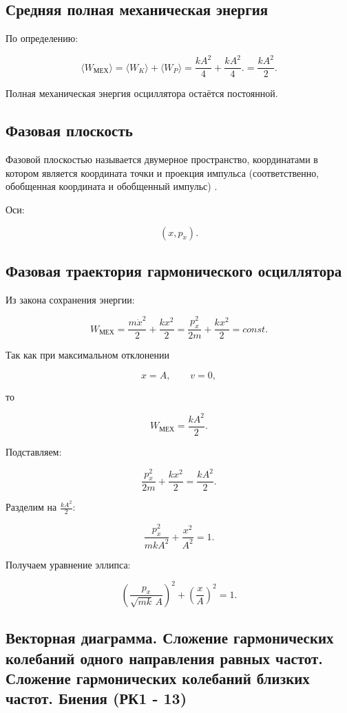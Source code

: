 \documentclass[a4paper,12pt]{article}
\begin{document}
\subsection*{Средняя полная механическая энергия}

По определению:

\[
\langle W_{\text{МЕХ}} \rangle
=
\langle W_K \rangle
+
\langle W_P \rangle
=
\frac{k A^2}{4}
+
\frac{k A^2}{4}. 
=
\frac{k A^2}{2}.
\]

Полная механическая энергия осциллятора остаётся постоянной.

\subsection*{Фазовая плоскость}

\begin{definitionbox}
Фазовой плоскостью называется двумерное пространство, координатами в котором является координата точки и проекция импульса (соответственно, обобщенная координата и обобщенный импульс) .
\end{definitionbox}

Оси:

\[
(x, p_x).
\]

\subsection*{Фазовая траектория гармонического осциллятора}

Из закона сохранения энергии:

\[
W_{\text{МЕХ}}
=
\frac{m \dot x^2}{2}
+
\frac{k x^2}{2}
=
\frac{p_x^2}{2m}
+
\frac{k x^2}{2}
=
const.
\]

Так как при максимальном отклонении

\[
x = A,
\qquad
v = 0,
\]

то

\[
W_{\text{МЕХ}}
=
\frac{k A^2}{2}.
\]

Подставляем:

\[
\frac{p_x^2}{2m}
+
\frac{k x^2}{2}
=
\frac{k A^2}{2}.
\]

Разделим на $\frac{k A^2}{2}$:

\[
\frac{p_x^2}{m k A^2}
+
\frac{x^2}{A^2}
=
1.
\]

Получаем уравнение эллипса:

\[
\left(
\frac{p_x}{\sqrt{m k}\,A}
\right)^2
+
\left(
\frac{x}{A}
\right)^2
=
1.
\] 

\subsection{Векторная диаграмма. Сложение гармонических колебаний одного направления равных частот. Сложение гармонических колебаний близких частот. Биения (РК1 - 13)}
\end{document}
